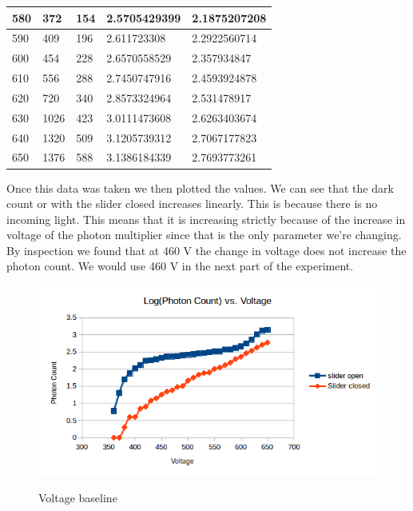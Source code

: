 \documentclass[12pt letterpaper]{article}
\begin{document}
\begin{table}[!htb]
\begin{tabular}{|l|p{1.25cm}|p{1.25cm}|l|l|}
580        & 372                           & 154                            & 2.5705429399          & 2.1875207208           \\ \hline
590        & 409                           & 196                            & 2.611723308           & 2.2922560714           \\ \hline
600        & 454                           & 228                            & 2.6570558529          & 2.357934847            \\ \hline
610        & 556                           & 288                            & 2.7450747916          & 2.4593924878           \\ \hline
620        & 720                           & 340                            & 2.8573324964          & 2.531478917            \\ \hline
630        & 1026                          & 423                            & 3.0111473608          & 2.6263403674           \\ \hline
640        & 1320                          & 509                            & 3.1205739312          & 2.7067177823           \\ \hline
650        & 1376                          & 588                            & 3.1386184339          & 2.7693773261           \\ \hline
\end{tabular}
\end{table}

Once this data was taken we then plotted the values. We can see that the dark count or with the slider closed increases linearly. This is because there is no incoming light. This means that it is increasing strictly because of the increase in voltage of the photon multiplier since that is the only parameter we're changing. By inspection we found that at 460 V the change in voltage does not increase the photon count. We would use 460 V in the next part of the experiment. 

\begin{figure}[!ht]
  \caption{Voltage baseline}
  \centering
    \includegraphics[width=\textwidth]{voltage_baseline.png}
    \label{fig:voltage baseline}
\end{figure}
\end{document}
